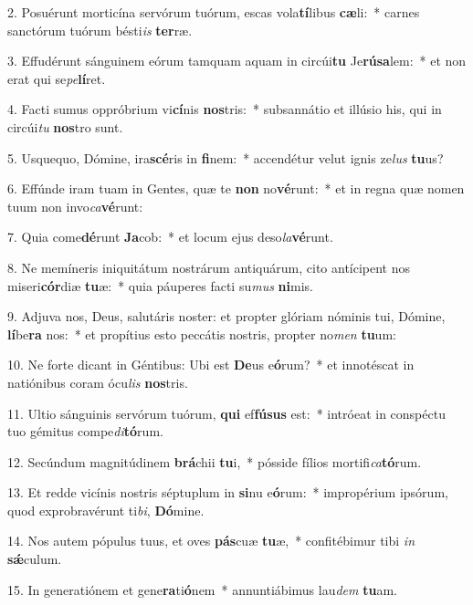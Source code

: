 2. Posuérunt morticína servórum tuórum, escas vola\textbf{tí}libus \textbf{cæ}li:~*  carnes sanctórum tuórum bésti\textit{is} \textbf{ter}ræ.\

3. Effudérunt sánguinem eórum tamquam aquam in circúi\textbf{tu} Je\textbf{rú}\textbf{sa}lem:~*  et non erat qui se\textit{pe}\textbf{lí}ret.\

4. Facti sumus oppróbrium vi\textbf{cí}nis \textbf{nos}tris:~*  subsannátio et illúsio his, qui in circúi\textit{tu} \textbf{nos}tro sunt.\

5. Usquequo, Dómine, ira\textbf{scé}ris in \textbf{fi}nem:~*  accendétur velut ignis ze\textit{lus} \textbf{tu}us?\

6. Effúnde iram tuam in Gentes, quæ te \textbf{non} no\textbf{vé}runt:~*  et in regna quæ nomen tuum non invo\textit{ca}\textbf{vé}runt:\

7. Quia come\textbf{dé}runt \textbf{Ja}cob:~*  et locum ejus deso\textit{la}\textbf{vé}runt.\

8. Ne memíneris iniquitátum nostrárum antiquárum, cito antícipent nos miseri\textbf{cór}diæ \textbf{tu}æ:~*  quia páuperes facti su\textit{mus} \textbf{ni}mis.\

9. Adjuva nos, Deus, salutáris noster: et propter glóriam nóminis tui, Dómine, \textbf{lí}be\textbf{ra} nos:~*  et propítius esto peccátis nostris, propter no\textit{men} \textbf{tu}um:\

10. Ne forte dicant in Géntibus: Ubi est \textbf{De}us e\textbf{ó}rum?~*  et innotéscat in natiónibus coram ócu\textit{lis} \textbf{nos}tris.\

11. Ultio sánguinis servórum tuórum, \textbf{qui} ef\textbf{fú}\textbf{sus} est:~*  intróeat in conspéctu tuo gémitus compe\textit{di}\textbf{tó}rum.\

12. Secúndum magnitúdinem \textbf{brá}chii \textbf{tu}i,~*  pósside fílios mortifi\textit{ca}\textbf{tó}rum.\

13. Et redde vicínis nostris séptuplum in \textbf{si}nu e\textbf{ó}rum:~*  impropérium ipsórum, quod exprobravérunt ti\textit{bi}, \textbf{Dó}mine.\

14. Nos autem pópulus tuus, et oves \textbf{pás}cuæ \textbf{tu}æ,~*  confitébimur tibi \textit{in} \textbf{sǽ}culum.\

15. In generatiónem et gene\textbf{ra}ti\textbf{ó}nem~*  annuntiábimus lau\textit{dem} \textbf{tu}am.\

